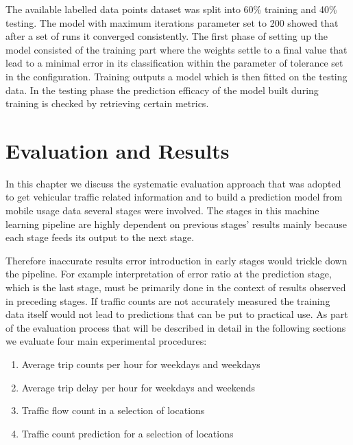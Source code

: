 \documentclass[12pt, a4paper]{report}
\theoremstyle{definition}
\theoremstyle{definition}%
\theoremstyle{definition}%
\theoremstyle{definition}%
\theoremstyle{definition}%
\theoremstyle{definition}%
\begin{document}
The available labelled data points dataset was split into 60\% training and 40\% testing. The model with maximum iterations parameter set to 200 showed that after a set of runs it converged consistently. The first phase of setting up the model consisted of the training part where the weights settle to a final value that lead to a minimal error in its classification within the parameter of tolerance set in the configuration. Training outputs a model which is then fitted on the testing data. In the testing phase the prediction efficacy of the model built during training is checked by retrieving certain metrics.



\chapter{Evaluation and Results} \label{chapter:evaluation_and_results}

In this chapter we discuss the systematic evaluation approach that was adopted to get vehicular traffic related information and to build a prediction model from mobile usage data several stages were involved. The stages in this machine learning pipeline are highly dependent on previous stages' results mainly because each stage feeds its output to the next stage. 

Therefore inaccurate results error introduction in early stages would trickle down the pipeline. For example interpretation of error ratio at the prediction stage, which is the last stage, must be primarily  done in the context of results observed in preceding stages. If traffic counts are not accurately measured the training data itself would not lead to predictions that can be put to practical use. As part of the evaluation process that will be described in detail in the following sections we evaluate four main experimental procedures:

\begin{enumerate}
	\item Average trip counts per hour for weekdays and weekdays
	\item Average trip delay per hour for weekdays and weekends
	\item Traffic flow count in a selection of locations
	\item Traffic count prediction for a selection of locations
\end{enumerate}

\end{document}
